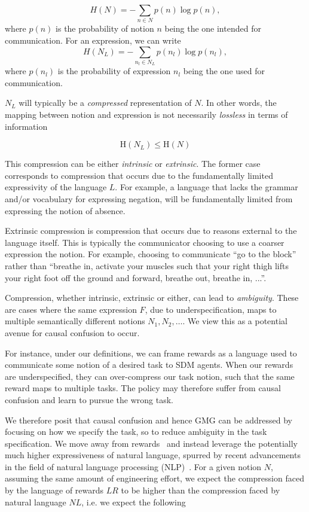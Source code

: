 \documentclass[../main.tex]{subfiles}
\begin{document}
\begin{equation}
	H(N) = -\sum_{n \in N} p(n) \log p(n),
\end{equation}
where $p(n)$ is the probability of notion $n$ being the one intended for communication. For an
expression, we can write
\begin{equation}
	H(N_L) = -\sum_{n_l \in N_L} p(n_l) \log p(n_l),
\end{equation}
where $p(n_l)$ is the probability of expression $n_l$ being the one used for communication.

$N_L$ will typically be a \emph{compressed} representation of $N$. In other words, the mapping
between notion and expression is not necessarily \emph{lossless} in terms of information

\begin{equation}
	\text{H}(N_L) \leq \text{H}(N)
\end{equation}

This compression can be either \emph{intrinsic} or \emph{extrinsic}. The former case corresponds to
compression that occurs due to the fundamentally limited expressivity of the language $L$. For
example, a language that lacks the grammar and/or vocabulary for expressing negation, will be
fundamentally limited from expressing the notion of absence.

Extrinsic compression is compression that occurs due to reasons external to the language itself.
This is typically the communicator choosing to use a coarser expression the notion. For example,
choosing to communicate ``go to the block'' rather than ``breathe in, activate your muscles such
that your right thigh lifts your right foot off the ground and forward, breathe out, breathe in,
...''.

Compression, whether intrinsic, extrinsic or either, can lead to \emph{ambiguity}. These are cases
where the same expression $F$, due to underspecification, maps to multiple semantically different
notions $N_1, N_2, \dots$. We view this as a potential avenue for causal confusion to occur.

For instance, under our definitions, we can frame rewards as a language used to communicate some
notion of a desired task to SDM agents. When our rewards are underspecified, they can over-compress
our task notion, such that the same reward maps to multiple tasks. The policy may therefore suffer
from causal confusion and learn to pursue the wrong task.

We therefore posit that causal confusion and hence GMG can be addressed by focusing on how we
specify the task, so to reduce ambiguity in the task specification. We move away from
rewards~\citep{vamplew_scalar_2022} and instead leverage the potentially much higher expressiveness
of natural language, spurred by recent advancements in the field of natural language processing
(NLP)~\citep{devlin_bert_2019, brown_language_2020, touvron_llama_2023}. For a given notion $N$,
assuming the same amount of engineering effort, we expect the compression faced by the language of
rewards $LR$ to be higher than the compression faced by natural language $NL$, i.e. we expect the
following
\end{document}
